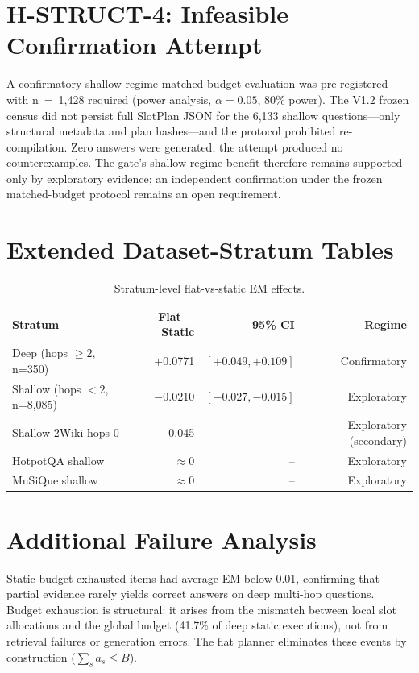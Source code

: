\documentclass[11pt,a4paper]{article}
\begin{document}
\section{H-STRUCT-4: Infeasible Confirmation Attempt} \label{sec:hstruct4}

A confirmatory shallow-regime matched-budget evaluation was pre-registered
with n~=~1,428 required (power analysis, $\alpha=0.05$, 80\% power). The V1.2
frozen census did not persist full SlotPlan JSON for the 6,133 shallow
questions---only structural metadata and plan hashes---and the protocol
prohibited re-compilation. Zero answers were generated; the attempt produced
no counterexamples. The gate's shallow-regime benefit therefore remains
supported only by exploratory evidence; an independent confirmation under the
frozen matched-budget protocol remains an open requirement.

\section{Extended Dataset-Stratum Tables} \label{sec:tables}

\begin{table}[h]
\centering\small
\begin{tabular}{lrrr}
\toprule
\textbf{Stratum} & \textbf{Flat $-$ Static} & \textbf{95\% CI} & \textbf{Regime} \\
\midrule
Deep (hops $\geq 2$, n=350) & $+$0.0771 & $[+0.049,+0.109]$ & Confirmatory \\
Shallow (hops $<2$, n=8,085) & $-$0.0210 & $[-0.027,-0.015]$ & Exploratory \\
Shallow 2Wiki hops-0 & $-$0.045 & -- & Exploratory (secondary) \\
HotpotQA shallow & $\approx 0$ & -- & Exploratory \\
MuSiQue shallow & $\approx 0$ & -- & Exploratory \\
\bottomrule
\end{tabular}
\caption{Stratum-level flat-vs-static EM effects.}
\label{tab:strata}
\end{table}

\section{Additional Failure Analysis} \label{sec:failure}

Static budget-exhausted items had average EM below 0.01, confirming that
partial evidence rarely yields correct answers on deep multi-hop questions.
Budget exhaustion is structural: it arises from the mismatch between local
slot allocations and the global budget (41.7\% of deep static executions),
not from retrieval failures or generation errors. The flat planner eliminates
these events by construction ($\sum_s a_s \leq B$).
\end{document}
